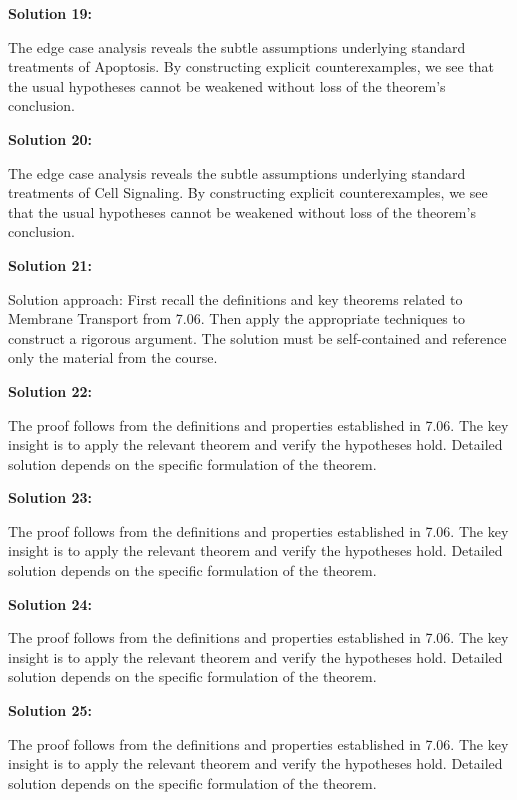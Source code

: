 \documentclass[12pt,a4paper]{exam}
\begin{document}
\vspace{0.5cm}

\textbf{Solution 19:}

The edge case analysis reveals the subtle assumptions underlying standard treatments of Apoptosis. By constructing explicit counterexamples, we see that the usual hypotheses cannot be weakened without loss of the theorem's conclusion.

\vspace{0.5cm}

\textbf{Solution 20:}

The edge case analysis reveals the subtle assumptions underlying standard treatments of Cell Signaling. By constructing explicit counterexamples, we see that the usual hypotheses cannot be weakened without loss of the theorem's conclusion.

\vspace{0.5cm}

\textbf{Solution 21:}

Solution approach: First recall the definitions and key theorems related to Membrane Transport from 7.06. Then apply the appropriate techniques to construct a rigorous argument. The solution must be self-contained and reference only the material from the course.

\vspace{0.5cm}

\textbf{Solution 22:}

The proof follows from the definitions and properties established in 7.06. The key insight is to apply the relevant theorem and verify the hypotheses hold. Detailed solution depends on the specific formulation of the theorem.

\vspace{0.5cm}

\textbf{Solution 23:}

The proof follows from the definitions and properties established in 7.06. The key insight is to apply the relevant theorem and verify the hypotheses hold. Detailed solution depends on the specific formulation of the theorem.

\vspace{0.5cm}

\textbf{Solution 24:}

The proof follows from the definitions and properties established in 7.06. The key insight is to apply the relevant theorem and verify the hypotheses hold. Detailed solution depends on the specific formulation of the theorem.

\vspace{0.5cm}

\textbf{Solution 25:}

The proof follows from the definitions and properties established in 7.06. The key insight is to apply the relevant theorem and verify the hypotheses hold. Detailed solution depends on the specific formulation of the theorem.

\vspace{0.5cm}
\end{document}
